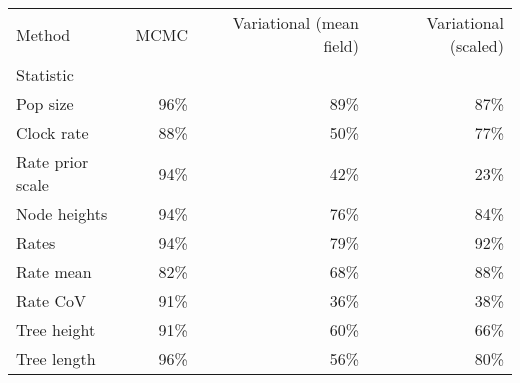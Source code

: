 \begin{tabular}{lrrr}
\toprule
Method &  MCMC &  Variational (mean field) &  Variational (scaled) \\
Statistic        &       &                           &                       \\
\midrule
Pop size         &   96\% &                       89\% &                   87\% \\
Clock rate       &   88\% &                       50\% &                   77\% \\
Rate prior scale &   94\% &                       42\% &                   23\% \\
Node heights     &   94\% &                       76\% &                   84\% \\
Rates            &   94\% &                       79\% &                   92\% \\
Rate mean        &   82\% &                       68\% &                   88\% \\
Rate CoV         &   91\% &                       36\% &                   38\% \\
Tree height      &   91\% &                       60\% &                   66\% \\
Tree length      &   96\% &                       56\% &                   80\% \\
\bottomrule
\end{tabular}

